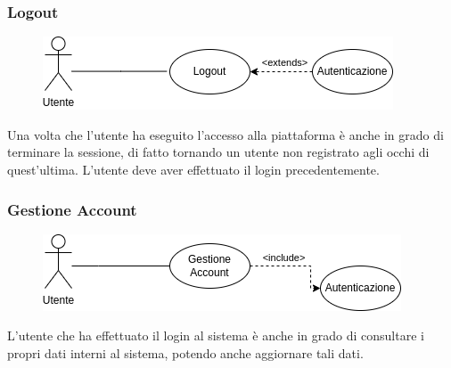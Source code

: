 \documentclass{article}
\begin{document}
\clearpage

\subsubsection{Logout}\label{rf_6}
\begin{description}
	
	\begin{figure}[htp]
		\centering
		\includegraphics[]{rf6.png}
	\end{figure}
	
	\item Una volta che l'utente ha eseguito l'accesso alla piattaforma è anche in grado di terminare la sessione, di fatto tornando un utente non registrato agli occhi di quest'ultima. L'utente deve aver effettuato il login precedentemente. 
\end{description}


\renewcommand\thesubsubsection{RF 8}
\subsubsection{Gestione Account}\label{rf_8}
\begin{description}
	
	\begin{figure}[htp]
		\centering
		\includegraphics[]{rf8.png}
	\end{figure}	
		
	\item L'utente che ha effettuato il login al sistema è anche in grado di consultare i propri dati interni al sistema, potendo anche aggiornare tali dati.
\end{description}

\renewcommand\thesubsubsection{RF 9}
\end{document}
